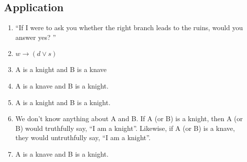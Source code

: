 \documentclass{../../cls/sig-alternate-05-2015}
\begin{document}
\subsection{Application}

\begin{enumerate}
\item \textquotedblleft If I were to ask you whether the right branch
leads to the ruins, would you answer yes? \textquotedblright
\item $w \rightarrow (d \vee s)$
\item A is a knight and B is a knave
\item A is a knave and B is a knight.
\item A is a knight and B is a knight.
\item We don\textquoteright t know anything about A and B. If A (or B) is a knight, then A (or B) would
truthfully say, \textquotedblleft I am a knight\textquotedblright. Likewise, if A (or B) is a knave, they would untruthfully
say, \textquotedblleft I am a knight\textquotedblright.
\item A is a knave and B is a knight.
\end{enumerate}
\end{document}
